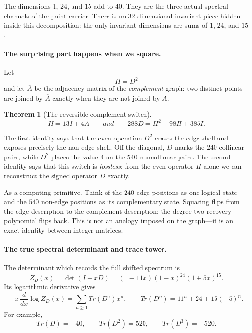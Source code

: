 \documentclass[11pt]{article}
\def\mathrm#1{#1}%
\def\textbf#1{#1}%
\def\text#1{#1}%
\newtheorem*{theorem}{Theorem}
\begin{document}
The dimensions $1$, $24$, and $15$ add to $40$.  They are the three
actual spectral channels of the point carrier.  There is no
$32$-dimensional invariant piece hidden inside this decomposition: the
only invariant dimensions are sums of $1$, $24$, and $15$.

\paragraph{The surprising part happens when we square.}
Let
\[
H=D^2
\]
and let $\overline A$ be the adjacency matrix of the \emph{complement}
graph: two distinct points are joined by $\overline A$ exactly when they
are not joined by $A$.

\begin{theorem}[The reversible complement switch]\label{thm:spec-dem}
\[
\boxed{H=13I+4\overline A}
\qquad\text{and}\qquad
\boxed{288D=H^2-98H+385I.}
\]
\end{theorem}

The first identity says that the even operation $D^2$ erases the edge
shell and exposes precisely the non-edge shell.  Off the diagonal,
$D$ marks the $240$ collinear pairs, while $D^2$ places the value $4$ on
the $540$ noncollinear pairs. %
The second identity says that this switch
is \emph{lossless}: from the even operator $H$ alone we can reconstruct
the signed operator $D$ exactly.

\begin{mathnote}
\textbf{As a computing primitive.}
Think of the $240$ edge positions as one logical state and the $540$ %
non-edge positions as its complementary state.  Squaring flips from the
edge description to the complement description; the degree-two recovery
polynomial flips back.  This is not an analogy imposed on the graph---it
is an exact identity between integer matrices.
\end{mathnote}

\paragraph{The true spectral determinant and trace tower.}
The determinant which records the full shifted spectrum is
\[
Z_D(x)=\det(I-xD)=(1-11x)(1-x)^{24}(1+5x)^{15}.
\]
Its logarithmic derivative gives
\[
-x\,\frac{d}{dx}\log Z_D(x)
=\sum_{n\ge1}\mathrm{Tr}(D^n)x^n,
\qquad
\boxed{\mathrm{Tr}(D^n)=11^n+24+15(-5)^n.}
\]
For example,
\[
\mathrm{Tr}(D)=-40,\qquad
\mathrm{Tr}(D^2)=520,\qquad
\mathrm{Tr}(D^3)=-520.
\]
\end{document}
